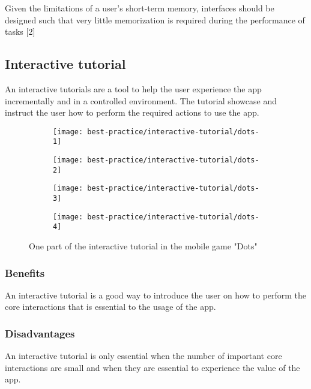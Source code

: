 Given the limitations of a user’s short-term memory, interfaces should be designed such that very little memorization is required during the performance of tasks [2]

\subsection{Interactive tutorial}

An interactive tutorials are a tool to help the user experience the app incrementally and in a controlled environment. The tutorial showcase and instruct the user how to perform the required actions to use the app.

\begin{figure}[ht]
\begin{subfigure}{.25\textwidth}
  \centering
  \texttt{[image: best-practice/interactive-tutorial/dots-1]}
  \label{subfig:best-practice/interactive-tutorial/dots-1}
\end{subfigure}%
\begin{subfigure}{.25\textwidth}
  \centering
  \texttt{[image: best-practice/interactive-tutorial/dots-2]}
  \label{subfig:best-practice/interactive-tutorial/dots-2}
\end{subfigure}%
\begin{subfigure}{.25\textwidth}
  \centering
  \texttt{[image: best-practice/interactive-tutorial/dots-3]}
  \label{subfig:best-practice/interactive-tutorial/dots-3}
\end{subfigure}%
\begin{subfigure}{.25\textwidth}
  \centering
  \texttt{[image: best-practice/interactive-tutorial/dots-4]}
  \label{subfig:best-practice/interactive-tutorial/dots-4}
\end{subfigure}%
\caption{One part of the interactive tutorial in the mobile game "Dots"}
\label{fig:general-overview}
\end{figure}

\subsubsection{Benefits}
An interactive tutorial is a good way to introduce the user on how to perform the core interactions that is essential to the usage of the app.

\subsubsection{Disadvantages}
An interactive tutorial is only essential when the number of important core interactions are small and when they are essential to experience the value of the app.

